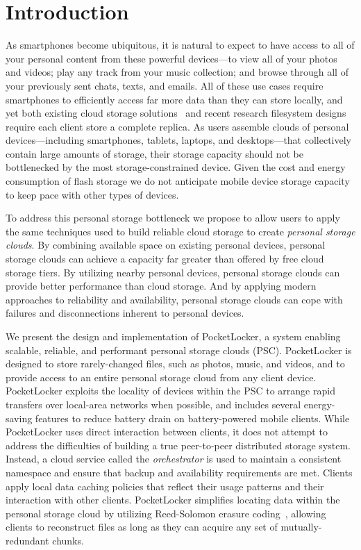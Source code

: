 
\section{Introduction}
\label{sec-introduction}

As smartphones become ubiquitous, it is natural to expect to have access to
all of your personal content from these powerful devices---to view all of
your photos and videos; play any track from your music collection; and browse
through all of your previously sent chats, texts, and emails. All of these
use cases require smartphones to efficiently access far more data than they
can store locally, and yet both existing cloud storage
solutions~\cite{dropbox, googledrive} and recent research filesystem
designs~\cite{mashtizadeh2013replication, peek2006ensemblue} require each
client store a complete replica. As users assemble clouds of personal
devices---including smartphones, tablets, laptops, and desktops---that
collectively contain large amounts of storage, their storage capacity should
not be bottlenecked by the most storage-constrained device. Given the cost
and energy consumption of flash storage we do not anticipate mobile device
storage capacity to keep pace with other types of devices.

To address this personal storage bottleneck we propose to allow users to
apply the same techniques used to build reliable cloud storage to create
\textit{personal storage clouds}. By combining available space on existing
personal devices, personal storage clouds can achieve a capacity far greater
than offered by free cloud storage tiers. By utilizing nearby personal
devices, personal storage clouds can provide better performance than cloud
storage. And by applying modern approaches to reliability and availability,
personal storage clouds can cope with failures and disconnections inherent to
personal devices.

We present the design and implementation of PocketLocker, a system enabling
scalable, reliable, and performant personal storage clouds (PSC). PocketLocker is
designed to store rarely-changed files, such as photos, music, and videos,
and to provide access to an entire personal storage cloud from any client
device. PocketLocker exploits the locality of devices within the PSC
to arrange rapid transfers over local-area networks when
possible, and includes several energy-saving features to reduce battery
drain on battery-powered mobile clients. While PocketLocker uses direct
interaction between clients, it does not attempt to address the difficulties
of building a true peer-to-peer distributed storage system. Instead, a cloud
service called the \textit{orchestrator} is used to maintain a consistent
namespace and ensure that backup and availability requirements are met.
Clients apply local data caching policies that reflect their usage patterns
and their interaction with other clients. PocketLocker simplifies
locating data within the personal storage cloud by utilizing Reed-Solomon
erasure coding~\cite{reed1960polynomial}, allowing clients to reconstruct files as
long as they can acquire any set of mutually-redundant chunks.

